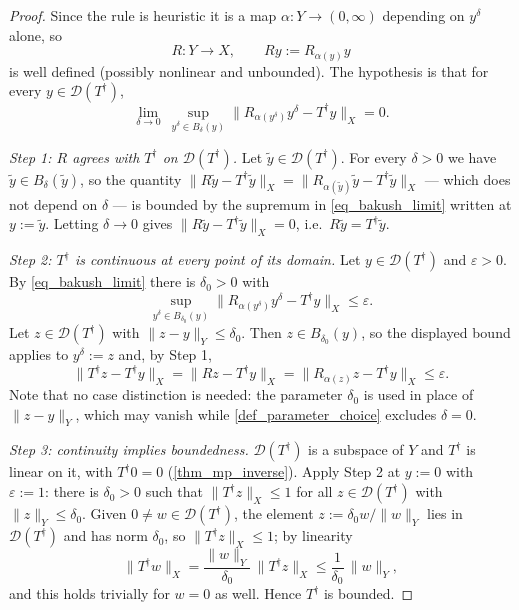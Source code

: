 \documentclass[a4paper]{report}
\theoremstyle{plain}
\theoremstyle{definition}
\theoremstyle{remark}
\newcommand{\Dom}{\mathcal{D}}
\newcommand{\dg}{^{\dagger}}
\begin{document}
\begin{proof}
  Since the rule is heuristic it is a map $\alpha \colon Y \to (0,\infty)$ depending on
  $y^{\delta}$ alone, so
  \[
    R \colon Y \to X, \qquad Ry := R_{\alpha(y)}y
  \]
  is well defined (possibly nonlinear and unbounded).  The hypothesis is that for every
  $y \in \Dom(T\dg)$,
  \begin{equation}\label{eq_bakush_limit}
    \lim_{\delta \to 0}\ \sup_{y^{\delta} \in B_{\delta}(y)}
      \|R_{\alpha(y^{\delta})}y^{\delta} - T\dg y\|_X = 0 .
  \end{equation}

  \emph{Step 1: $R$ agrees with $T\dg$ on $\Dom(T\dg)$.}  Let
  $\tilde{y} \in \Dom(T\dg)$.  For every $\delta > 0$ we have
  $\tilde{y} \in B_{\delta}(\tilde{y})$, so the quantity
  $\|R\tilde{y} - T\dg\tilde{y}\|_X = \|R_{\alpha(\tilde{y})}\tilde{y}
  - T\dg\tilde{y}\|_X$ --- which does not depend on $\delta$ --- is bounded by the
  supremum in \eqref{eq_bakush_limit} written at $y := \tilde{y}$.  Letting
  $\delta \to 0$ gives $\|R\tilde{y} - T\dg\tilde{y}\|_X = 0$, i.e.\
  $R\tilde{y} = T\dg\tilde{y}$.

  \emph{Step 2: $T\dg$ is continuous at every point of its domain.}  Let
  $y \in \Dom(T\dg)$ and $\varepsilon > 0$.  By \eqref{eq_bakush_limit} there is
  $\delta_0 > 0$ with
  \[
    \sup_{y^{\delta} \in B_{\delta_0}(y)}
      \|R_{\alpha(y^{\delta})}y^{\delta} - T\dg y\|_X \le \varepsilon .
  \]
  Let $z \in \Dom(T\dg)$ with $\|z - y\|_Y \le \delta_0$.  Then $z \in B_{\delta_0}(y)$,
  so the displayed bound applies to $y^{\delta} := z$ and, by Step 1,
  \[
    \|T\dg z - T\dg y\|_X = \|Rz - T\dg y\|_X
      = \|R_{\alpha(z)}z - T\dg y\|_X \le \varepsilon .
  \]
  Note that no case distinction is needed: the parameter $\delta_0$ is used in place of
  $\|z - y\|_Y$, which may vanish while \cref{def_parameter_choice} excludes
  $\delta = 0$.

  \emph{Step 3: continuity implies boundedness.}  $\Dom(T\dg)$ is a subspace of $Y$ and
  $T\dg$ is linear on it, with $T\dg 0 = 0$ (\cref{thm_mp_inverse}).  Apply Step 2 at
  $y := 0$ with $\varepsilon := 1$: there is $\delta_0 > 0$ such that
  $\|T\dg z\|_X \le 1$ for all $z \in \Dom(T\dg)$ with $\|z\|_Y \le \delta_0$.  Given
  $0 \ne w \in \Dom(T\dg)$, the element $z := \delta_0 w/\|w\|_Y$ lies in $\Dom(T\dg)$ and
  has norm $\delta_0$, so $\|T\dg z\|_X \le 1$; by linearity
  \[
    \|T\dg w\|_X = \frac{\|w\|_Y}{\delta_0}\,\|T\dg z\|_X
      \le \frac{1}{\delta_0}\,\|w\|_Y ,
  \]
  and this holds trivially for $w = 0$ as well.  Hence $T\dg$ is bounded.
\end{proof}
\end{document}
